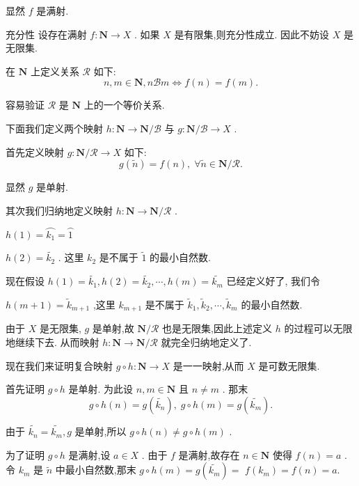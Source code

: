 显然 $f$ 是满射.

充分性 设存在满射 $f : \mathbf{N} \rightarrow  X$ . 如果 $X$ 是有限集,则充分性成立. 因此不妨设 $X$ 是无限集.

在 $\mathbf{N}$ 上定义关系 $\mathcal{R}$ 如下:
$$n,m \in  \mathbf{N},n\mathcal{B}m \Leftrightarrow  f\left( n\right)  = f\left( m\right) .$$

容易验证 $\mathcal{R}$ 是 $\mathbf{N}$ 上的一个等价关系.

下面我们定义两个映射 $h : \mathbf{N} \rightarrow  \mathbf{N}/\mathcal{B}$ 与 $g : \mathbf{N}/\mathcal{B} \rightarrow  X$ .

首先定义映射 $g : \mathbf{N}/\mathcal{R} \rightarrow  X$ 如下:
$$g\left( \widetilde{n}\right)  = f\left( n\right) ,\;\forall \widetilde{n} \in  \mathbf{N}/\mathcal{R}.$$

显然 $g$ 是单射.

其次我们归纳地定义映射 $h : \mathbf{N} \rightarrow  \mathbf{N}/\mathcal{R}$ .

$h\left( 1\right)  = \overset{⏜}{{k}_{1}} = \overset{⏜}{1}$

$h\left( 2\right)  = \widetilde{{k}_{2}}$ . 这里 ${k}_{2}$ 是不属于 $\widetilde{1}$ 的最小自然数.

现在假设 $h\left( 1\right)  = \widetilde{{k}_{1}},h\left( 2\right)  = \widetilde{{k}_{2}},\cdots ,h\left( m\right)  = \widetilde{{k}_{m}}$ 已经定义好了, 我们令

$h\left( {m + 1}\right)  = {\widetilde{k}}_{m + 1}$ ,这里 ${k}_{m + 1}$ 是不属于 ${\widetilde{k}}_{1},{\widetilde{k}}_{2},\cdots ,{\widetilde{k}}_{m}$ 的最小自然数.

由于 $X$ 是无限集, $g$ 是单射,故 $\mathbf{N}/\mathcal{R}$ 也是无限集,因此上述定义 $h$ 的过程可以无限地继续下去. 从而映射 $h : \mathbf{N} \rightarrow  \mathbf{N}/\mathcal{R}$ 就完全归纳地定义了.

现在我们来证明复合映射 $g \circ  h : \mathbf{N} \rightarrow  X$ 是一一映射,从而 $X$ 是可数无限集.

首先证明 $g \circ  h$ 是单射. 为此设 $n,m \in  \mathbf{N}$ 且 $n \neq  m$ . 那末
$$g \circ  h\left( n\right)  = g\left( \widetilde{{k}_{n}}\right) ,\;g \circ  h\left( m\right)  = g\left( \widetilde{{k}_{m}}\right) .$$

由于 $\widetilde{{k}_{n}} = \widetilde{{k}_{m}},g$ 是单射,所以 $g \circ  h\left( n\right)  \neq  g \circ  h\left( m\right)$ .

为了证明 $g \circ  h$ 是满射,设 $a \in  X$ . 由于 $f$ 是满射,故存在 $n \in  \mathbf{N}$ 使得 $f\left( n\right)  = a$ . 令 ${k}_{m}$ 是 $\widetilde{n}$ 中最小自然数,那末 $g \circ  h\left( m\right)  = g\left( \widetilde{{k}_{m}}\right)  =$  $f\left( {k}_{m}\right)  = f\left( n\right)  = a.$

